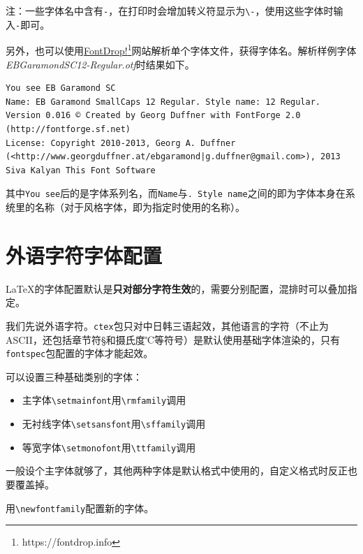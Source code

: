 \documentclass[10pt,openany]{book}
\newenvironment{tightitem}
{\begin{itemize}[topsep=0pt,partopsep=0pt,itemsep=0pt,parsep=0pt,leftmargin=3\ccwd,labelwidth=1.5\ccwd,labelsep=.5\ccwd]}
        {\end{itemize}}
\begin{document}
注：一些字体名中含有\texttt{-}，在打印时会增加转义符显示为\texttt{\textbackslash{}-}，使用这些字体时输入\texttt{-}即可。

另外，也可以使用\href{https://fontdrop.info}{FontDrop!\footnote{https://fontdrop.info}}网站解析单个字体文件，获得字体名。解析样例字体\emph{EBGaramondSC12-Regular.otf}时结果如下。

\begin{lstlisting}[title=FontDrop!解析结果]
You see EB Garamond SC
Name: EB Garamond SmallCaps 12 Regular. Style name: 12 Regular. Version 0.016 © Created by Georg Duffner with FontForge 2.0 (http://fontforge.sf.net)
License: Copyright 2010-2013, Georg A. Duffner (<http://www.georgduffner.at/ebgaramond|g.duffner@gmail.com>), 2013 Siva Kalyan This Font Software  
\end{lstlisting}

其中\texttt{You\ see}后的是字体系列名，而\texttt{Name}与\texttt{.\ Style\ name}之间的即为字体本身在系统里的名称（对于风格字体，即为指定时使用的名称）。

\section{外语字符字体配置}

\LaTeX 的字体配置默认是\textbf{只对部分字符生效}的，需要分别配置，混排时可以叠加指定。

我们先说外语字符。\texttt{ctex}包只对中日韩三语起效，其他语言的字符（不止为ASCII，还包括章节符\S 和摄氏度{\songtien℃}等符号）是默认使用基础字体渲染的，只有\texttt{fontspec}包配置的字体才能起效。



可以设置三种基础类别的字体：

\begin{tightitem}
    \item 主字体\texttt{\textbackslash{}setmainfont}用\texttt{\textbackslash{}rmfamily}调用
    \item 无衬线字体\texttt{\textbackslash{}setsansfont}用\texttt{\textbackslash{}sffamily}调用
    \item 等宽字体\texttt{\textbackslash{}setmonofont}用\texttt{\textbackslash{}ttfamily}调用
\end{tightitem}

一般设个主字体就够了，其他两种字体是默认格式中使用的，自定义格式时反正也要覆盖掉。

用\texttt{\textbackslash{}newfontfamily}配置新的字体。
\end{document}
